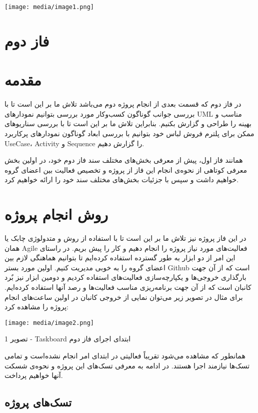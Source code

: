 \documentclass[]{article}
\date{}
\begin{document}
\texttt{[image: media/image1.png]}

\section{فاز دوم}\label{ux641ux627ux632-ux62fux648ux645}

\section{مقدمه}\label{ux645ux642ux62fux645ux647}

در فاز دوم که قسمت بعدی از انجام پروژه دوم می‌باشد تلاش ما بر این است تا
با بررسی جوانب گوناگون کسب‌وکار مورد بررسی بتوانیم نمودارهای UML مناسب و
بهینه را طراحی و گزارش بکنیم. بنابراین تلاش ما بر این است تا با بررسی
سناریو‌های ممکن برای پلترم فروش لباس خود بتوانیم با بررسی ابعاد گوناگون
نمودارهای پرکاربرد UseCase، Activity و Sequence را گزارش دهیم.

همانند فاز اول، پیش از معرفی بخش‌های مختلف سند فاز دوم خود، در اولین بخش
معرفی کوتاهی از نحوه‌ی انجام این فاز از پروژه و تخصیص فعالیت بین اعضای
گروه خواهیم داشت و سپس با جزئیات بخش‌های مختلف سند خود را ارائه خواهیم
کرد.

\section{روش انجام
پروژه}\label{ux631ux648ux634-ux627ux646ux62cux627ux645-ux67eux631ux648ux698ux647}

در این فاز پروژه نیز تلاش ما بر این است تا با استفاده از روش و متدولوژی
چابک یا همان Agile فعالیت‌های مورد نیاز پروژه را انجام دهیم و کار را پیش
بریم. در راستای این امر از دو ابزار به طور گسترده استفاده کرده‌ایم تا
بتوانیم هماهنگی لازم بین اعضای گروه را به خوبی مدیریت کنیم. اولین مورد
بستر Github است که از آن جهت بارگذاری خروجی‌ها و یکپارچه‌سازی فعالیت‌های
استفاده کردیم و دومین ابزار نیز بٌرد کانبان است که از آن جهت برنامه‌ریزی
مناسب فعالیت‌ها و رصد آنها استفاده کرده‌ایم. برای مثال در تصویر زیر
می‌توان نمایی از خروجی کانبان در اولین ساعت‌های انجام پروژه را مشاهده
کرد:

\texttt{[image: media/image2.png]}

تصویر 1 - Taskboard ابتدای اجرای فاز دوم

همانطور که مشاهده می‌شود تقریباً فعالیتی در ابتدای امر انجام نشده‌است و
تمامی تسک‌ها نیازمند اجرا هستند. در ادامه به معرفی تسک‌های این پروژه و
نحوه‌ی شسکت‌ آنها خواهیم پرداخت.

\subsection{تسک‌های
پروژه}\label{ux62aux633ux6a9ux647ux627ux6cc-ux67eux631ux648ux698ux647}
\end{document}

